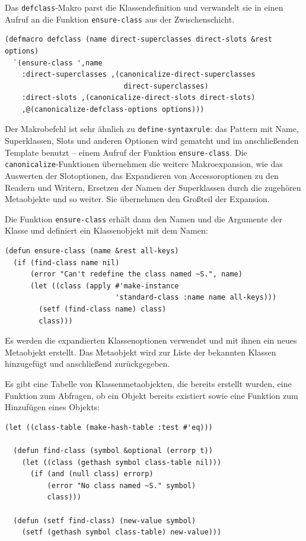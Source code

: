 Das \texttt{defclass}-Makro parst die Klassendefinition und verwandelt sie in einen Aufruf an die Funktion \texttt{ensure-class} aus der Zwischenschicht. 

\begin{lstlisting}
(defmacro defclass (name direct-superclasses direct-slots &rest options)
  `(ensure-class ',name
    :direct-superclasses ,(canonicalize-direct-superclasses 
                            direct-superclasses)
    :direct-slots ,(canonicalize-direct-slots direct-slots)
    ,@(canonicalize-defclass-options options)))
\end{lstlisting}

Der Makrobefehl ist sehr ähnlich zu \texttt{define-syntaxrule}: das Pattern mit Name, Superklassen, Slots und anderen Optionen wird gematcht und im anschließenden Template benutzt -- einem Aufruf der Funktion \texttt{ensure-class}. Die \texttt{canonicalize}-Funktionen übernehmen die weitere Makroexpansion, wie das Auswerten der Slotoptionen, das Expandieren von Accessoroptionen zu den Readern und Writern, Ersetzen der Namen der Superklassen durch die zugehören Metaobjekte und so weiter. Sie übernehmen den Großteil der Expansion.

Die Funktion \texttt{ensure-class} erhält dann den Namen und die Argumente der Klasse und definiert ein Klassenobjekt mit dem Namen:

\begin{lstlisting}
(defun ensure-class (name &rest all-keys)
  (if (find-class name nil)
      (error "Can't redefine the class named ~S.", name)
      (let ((class (apply #'make-instance
                          'standard-class :name name all-keys)))
        (setf (find-class name) class)
        class)))
\end{lstlisting}

Es werden die expandierten Klassenoptionen verwendet und mit ihnen ein neues Metaobjekt erstellt. Das Metaobjekt wird zur Liste der bekannten Klassen hinzugefügt und anschließend zurückgegeben. 

Es gibt eine Tabelle von Klassenmetaobjekten, die bereits erstellt wurden, eine Funktion zum Abfragen, ob ein Objekt bereits existiert sowie eine Funktion zum Hinzufügen eines Objekts:

\begin{lstlisting}
(let ((class-table (make-hash-table :test #'eq)))
  
  (defun find-class (symbol &optional (errorp t))
    (let ((class (gethash symbol class-table nil)))
      (if (and (null class) errorp)
          (error "No class named ~S." symbol)
          class)))
  
  (defun (setf find-class) (new-value symbol)
    (setf (gethash symbol class-table) new-value)))
\end{lstlisting}

